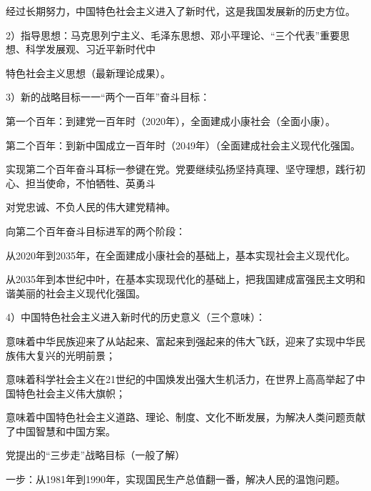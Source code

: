 \documentclass[lang=cn,11pt]{elegantbook}
\begin{document}
经过长期努力，中国特色社会主义进入了新时代，这是我国发展新的历史方位。\par

2）指导思想：马克思列宁主义、毛泽东思想、邓小平理论、“三个代表”重要思想、科学发展观、习近平新时代中\par

特色社会主义思想（最新理论成果）。\par

3）新的战略目标一一“两个一百年”奋斗目标：\par

第一个百年：到建党一百年时（2020年），全面建成小康社会（全面小康）。\par

第二个百年：到新中国成立一百年时（2049年）（全面建成社会主义现代化强国。\par

实现第二个百年奋斗耳标一参键在党。党要继续弘扬坚持真理、坚守理想，践行初心、担当使命，不怕牺牲、英勇斗\par

对党忠诚、不负人民的伟大建党精神。\par

向第二个百年奋斗目标进军的两个阶段：\par

从2020年到2035年，在全面建成小康社会的基础上，基本实现社会主义现代化。\par

从2035年到本世纪中叶，在基本实现现代化的基础上，把我国建成富强民主文明和谐美丽的社会主义现代化强国。\par

4）中国特色社会主义进入新时代的历史意义（三个意味）：\par

意味着中华民族迎来了从站起来、富起来到强起来的伟大飞跃，迎来了实现中华民族伟大复兴的光明前景；\par

意味着科学社会主义在21世纪的中国焕发出强大生机活力，在世界上高高举起了中国特色社会主义伟大旗帜；\par

意味着中国特色社会主义道路、理论、制度、文化不断发展，为解决人类问题贡献了中国智慧和中国方案。\par

党提出的“三步走”战略目标（一般了解）\par

一步：从1981年到1990年，实现国民生产总值翻一番，解决人民的温饱问题。\par
\end{document}
